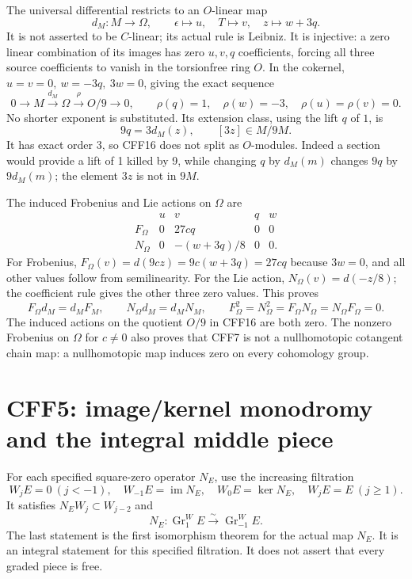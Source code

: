 \documentclass[11pt]{article}
\newcommand{\im}{\operatorname{im}}
\begin{document}
The universal differential restricts to an \(O\)-linear map
\[
 d_M:M\longrightarrow\Omega,\qquad
 \epsilon\mapsto u,\quad T\mapsto v,\quad z\mapsto w+3q.
 \tag{CFF15}
\]
It is not asserted to be \(C\)-linear; its actual rule is Leibniz.
It is injective: a zero linear combination of its images has zero
\(u,v,q\) coefficients, forcing all three source coefficients to
vanish in the torsionfree ring \(O\).
In the cokernel, \(u=v=0,\ w=-3q,\ 3w=0\), giving the exact sequence
\[
 0\longrightarrow M\xrightarrow{d_M}\Omega
   \xrightarrow{\rho}O/9\longrightarrow0,\qquad
 \rho(q)=1,\quad\rho(w)=-3,\quad\rho(u)=\rho(v)=0 .
 \tag{CFF16}
\]
No shorter exponent is substituted. Its extension class, using the
lift \(q\) of \(1\), is
\[
                   9q=3d_M(z),\qquad [3z]\in M/9M.
 \tag{CFF17}
\]
It has exact order 3, so CFF16 does not split as \(O\)-modules.
Indeed a section would provide a lift of 1 killed by 9, while
changing \(q\) by \(d_M(m)\) changes \(9q\) by \(9d_M(m)\);
the element \(3z\) is not in \(9M\).

The induced Frobenius and Lie actions on \(\Omega\) are
\[
 \begin{array}{c|rrrr}
       &u&v&q&w\\ \hline
 F_\Omega&0&27cq&0&0\\
 N_\Omega&0&-(w+3q)/8&0&0 .
 \end{array}
 \tag{CFF18}
\]
For Frobenius, \(F_\Omega(v)=d(9cz)=9c(w+3q)=27cq\)
because \(3w=0\), and all other values follow from semilinearity.
For the Lie action, \(N_\Omega(v)=d(-z/8)\);
the coefficient rule gives the other three zero values.
This proves
\[
 F_\Omega d_M=d_MF_M,\qquad N_\Omega d_M=d_MN_M,\qquad
 F_\Omega^2=N_\Omega^2=F_\Omega N_\Omega=N_\Omega F_\Omega=0.
 \tag{CFF19}
\]
The induced actions on the quotient \(O/9\) in CFF16 are both zero.
The nonzero Frobenius on \(\Omega\) for \(c\ne0\) also proves
that CFF7 is not a nullhomotopic cotangent chain map: a
nullhomotopic map induces zero on every cohomology group.

\section{CFF5: image/kernel monodromy and the integral middle piece}
For each specified square-zero operator \(N_E\), use the increasing
filtration
\[
 W_jE=0\ (j<-1),\quad W_{-1}E=\im N_E,\quad
 W_0E=\ker N_E,\quad W_jE=E\ (j\ge1).
 \tag{CFF20}
\]
It satisfies \(N_EW_j\subset W_{j-2}\) and
\[
 N_E:\operatorname{Gr}^W_1 E\xrightarrow{\sim}
                  \operatorname{Gr}^W_{-1}E .
 \tag{CFF21}
\]
The last statement is the first isomorphism theorem for the actual
map \(N_E\). It is an integral statement for this specified
filtration. It does not assert that every graded piece is free.
\end{document}
